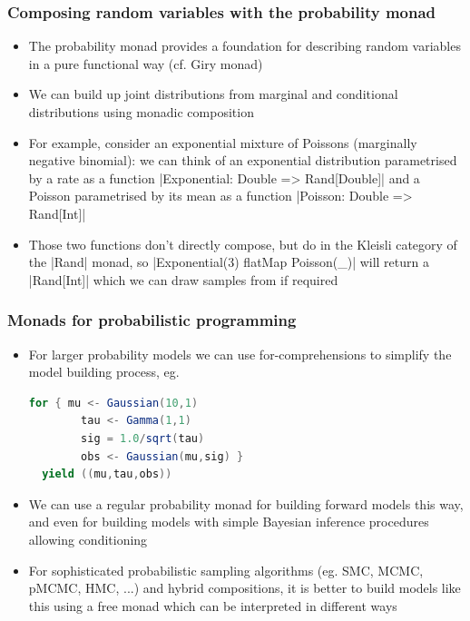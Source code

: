 \documentclass[mathserif,handout]{beamer}
\begin{document}
\begin{frame}[fragile]
  \frametitle{Composing random variables with the probability monad}
  \begin{itemize}
  \item The \alert{probability monad} provides a foundation for describing random variables in a pure functional way (cf. \alert{Giry monad})
  \item We can build up joint distributions from marginal and conditional distributions using \alert{monadic composition}
  \item For example, consider an exponential mixture of Poissons (marginally negative binomial): we can think of an exponential distribution parametrised by a rate as a function |Exponential: Double => Rand[Double]| and a Poisson parametrised by its mean as a function |Poisson: Double => Rand[Int]|
    \item Those two functions don't directly compose, but do in the Kleisli category of the |Rand| monad, so |Exponential(3) flatMap {Poisson(_)}| will return a |Rand[Int]| which we can draw samples from if required
  \end{itemize}
\end{frame}

\begin{frame}[fragile]
  \frametitle{Monads for probabilistic programming}
  \begin{itemize}
    \item For larger probability models we can use \alert{for-comprehensions} to simplify the model building process, eg.
\begin{lstlisting}[language=scala]
  for { mu <- Gaussian(10,1)
        tau <- Gamma(1,1)
        sig = 1.0/sqrt(tau)
        obs <- Gaussian(mu,sig) }
  yield ((mu,tau,obs))
\end{lstlisting}
  \item We can use a regular probability monad for building forward models this way, and even for building models with simple Bayesian inference procedures allowing conditioning
    \item For sophisticated probabilistic sampling algorithms (eg. SMC, MCMC, pMCMC, HMC, ...) and hybrid compositions, it is better to build models like this using a \alert{free monad} which can be \alert{interpreted} in different ways
  \end{itemize}
\end{frame}
\end{document}
